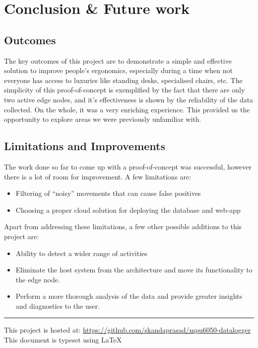 \documentclass[./RTPostureTrackingReport.tex]{subfiles}
\begin{document}
\chapter{Conclusion \& Future work}\label{chap:concl}
\section{Outcomes}\label{sec:conclout}
The key outcomes of this project are to demonstrate a simple and effective
solution to improve people's ergonomics, especially during a time when not
everyone has access to luxuries like standing desks, specialised chairs, etc.
The simplicity of this proof-of-concept is exemplified by the fact that there
are only two active edge nodes, and it's effectiveness is shown by the
reliability of the data collected. On the whole, it was a very enriching
experience. This provided us the opportunity to explore areas we were
previously unfamiliar with.

\section{Limitations and Improvements}\label{sec:concllim}
The work done so far to come up with a proof-of-concept was successful, however
there is a lot of room for improvement. A few limitations are:
\begin{itemize}
    \item Filtering of ``noisy'' movements that can cause false positives
    \item Choosing a proper cloud solution for deploying the database and
        web-app
\end{itemize}

Apart from addressing these limitations, a few other possible additions to this
project are:
\begin{itemize}
    \item Ability to detect a wider range of activities
    \item Eliminate the host system from the architecture and move its
        functionality to the edge node.
    \item Perform a more thorough analysis of the data and provide greater
        insights and diagnostics to the user.
\end{itemize}
\vspace{2cm}

\hrule
\vspace{2cm}

\centering
This project is hosted at: \url{https://github.com/skandaprasad/mpu6050-datalogger}
\\
\vspace{0.5cm}
This document is typeset using \LaTeX
\end{document}
